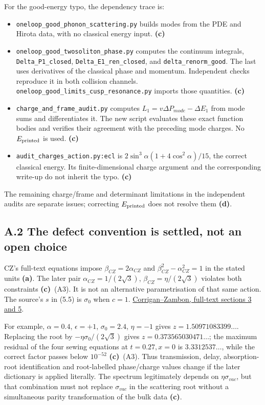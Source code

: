 \documentclass[11pt,a4paper]{article}
\newcommand{\A}{\textsf{\textbf{(a)}}}
\newcommand{\C}{\textsf{\textbf{(c)}}}
\newcommand{\D}{\textsf{\textbf{(d)}}}
\newcommand{\file}[1]{\nolinkurl{#1}}
\begin{document}
For the good-energy typo, the dependency trace is:
\begin{itemize}[leftmargin=*]
\item \file{oneloop_good_phonon_scattering.py} builds modes from the PDE and
Hirota data, with no classical energy input. \C
\item \file{oneloop_good_twosoliton_phase.py} computes the continuum integrals,
\file{Delta_P1_closed}, \file{Delta_E1_ren_closed}, and
\file{delta_renorm_good}. The last uses derivatives of the classical phase
and momentum. Independent checks reproduce it in both collision channels.
\file{oneloop_good_limits_cusp_resonance.py} imports those quantities. \C
\item \file{charge_and_frame_audit.py} computes
$L_1=v\Delta P_{mode}-\Delta E_1$ from mode sums and differentiates it.
The new script evaluates these exact function bodies and verifies their
agreement with the preceding mode charges. No $E_{\rm printed}$ is used. \C
\item \file{audit_charges_action.py:ecl} is
$2\sin^3\alpha(1+4\cos^2\alpha)/15$, the correct classical energy.
Its finite-dimensional charge argument and the corresponding write-up do
not inherit the typo. \C
\end{itemize}
The remaining charge/frame and determinant limitations in the independent
audits are separate issues; correcting $E_{\rm printed}$ does not resolve
them \D.

\subsection*{A.2 The defect convention is settled, not an open choice}
CZ's full-text equations impose $\beta_{CZ}=2\alpha_{CZ}$ and
$\beta_{CZ}^2-\alpha_{CZ}^2=1$ in the stated units \A.
The later pair $\alpha_{CZ}=1/(2\sqrt3)$,
$\beta_{CZ}=\eta/(2\sqrt3)$ violates both constraints \C\ (A3).
It is not an alternative parametrisation of that same action.
The source's $s$ in (5.5) is $\sigma_0$ when $c=1$.
\href{https://arxiv.org/html/2306.03772v1}{Corrigan--Zambon, full-text sections 3 and 5}.

For example, $\alpha=0.4$, $\epsilon=+1$, $\sigma_0=2.4$, $\eta=-1$
gives $z=1.50971083399\ldots$. Replacing the root by
$-\eta\sigma_0/(2\sqrt3)$ gives $z=0.373565030471\ldots$;
the maximum residual of the four sewing equations at $t=0.27,x=0$ is
$3.3312537\ldots$, while the correct factor passes below $10^{-52}$ \C\ (A3).
Thus transmission, delay, absorption-root identification and root-labelled
phase/charge values change if the later dictionary is applied literally.
The spectrum legitimately depends on $\eta\sigma_{vac}$, but that combination
must not replace $\sigma_{vac}$ in the scattering root without a simultaneous
parity transformation of the bulk data \C.
\end{document}

